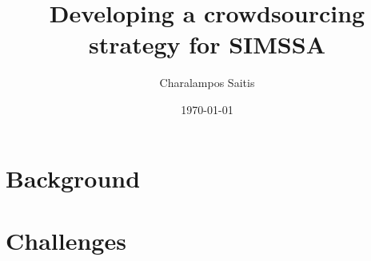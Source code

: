 \documentclass[letter,11pt,normalheadings]{scrreprt}
\title{Developing a crowdsourcing strategy for SIMSSA}
\author{Charalampos Saitis}
\date{\today}
\begin{document}
\maketitle


\section{Background}
\lipsum[1]

\section{Challenges}
\lipsum[1]
\end{document}
